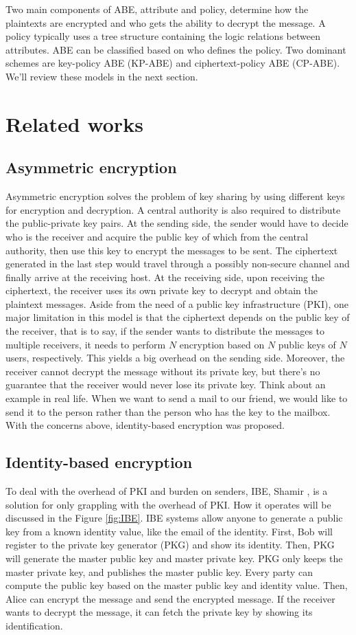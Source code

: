 \documentclass[12pt]{article}
\begin{document}
Two main components of ABE, attribute and policy, determine how the plaintexts are encrypted and who gets the ability to decrypt the message. A policy typically uses a tree structure containing the logic relations between attributes. ABE can be classified based on who defines the policy. Two dominant schemes are key-policy ABE (KP-ABE) and ciphertext-policy ABE (CP-ABE). We’ll review these models in the next section.

\section{Related works}
\subsection{Asymmetric encryption}
Asymmetric encryption solves the problem of key sharing by using different keys for encryption and decryption. A central authority is also required to distribute the public-private key pairs. At the sending side, the sender would have to decide who is the receiver and acquire the public key of which from the central authority, then use this key to encrypt the messages to be sent. The ciphertext generated in the last step would travel through a possibly non-secure channel and finally arrive at the receiving host. At the receiving side, upon receiving the ciphertext, the receiver uses its own private key to decrypt and obtain the plaintext messages. Aside from the need of a public key infrastructure (PKI), one major limitation in this model is that the ciphertext depends on the public key of the receiver, that is to say, if the sender wants to distribute the messages to multiple receivers, it needs to perform $N$ encryption based on $N$ public keys of $N$ users, respectively. This yields a big overhead on the sending side. Moreover, the receiver cannot decrypt the message without its private key, but there’s no guarantee that the receiver would never lose its private key. Think about an example in real life. When we want to send a mail to our friend, we would like to send it to the person rather than the person who has the key to the mailbox. With the concerns above, identity-based encryption was proposed.
\subsection{Identity-based encryption}
To deal with the overhead of PKI and burden on senders, IBE, Shamir \cite{Sha:85}, is a solution for only grappling with the overhead of PKI. How it operates will be discussed in the Figure \ref{fig:IBE}. IBE systems allow anyone to generate a public key from a known identity value, like the email of the identity. First, Bob will register to the private key generator (PKG) and show its identity. Then, PKG will generate the master public key and master private key. PKG only keeps the master private key, and publishes the master public key. Every party can compute the public key based on the master public key and identity value. Then, Alice can encrypt the message and send the encrypted message. If the receiver wants to decrypt the message, it can fetch the private key by showing its identification.
\end{document}
